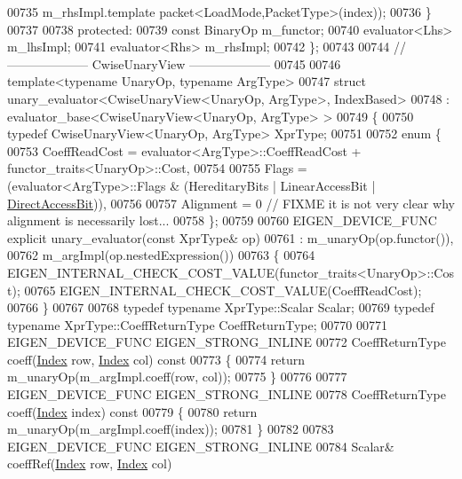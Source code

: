 \begin{DoxyCode}
00735                               m\_rhsImpl.template packet<LoadMode,PacketType>(index));
00736   \}
00737 
00738 \textcolor{keyword}{protected}:
00739   \textcolor{keyword}{const} BinaryOp m\_functor;
00740   evaluator<Lhs> m\_lhsImpl;
00741   evaluator<Rhs> m\_rhsImpl;
00742 \};
00743 
00744 \textcolor{comment}{// -------------------- CwiseUnaryView --------------------}
00745 
00746 \textcolor{keyword}{template}<\textcolor{keyword}{typename} UnaryOp, \textcolor{keyword}{typename} ArgType>
00747 \textcolor{keyword}{struct }unary\_evaluator<CwiseUnaryView<UnaryOp, ArgType>, IndexBased>
00748   : evaluator\_base<CwiseUnaryView<UnaryOp, ArgType> >
00749 \{
00750   \textcolor{keyword}{typedef} CwiseUnaryView<UnaryOp, ArgType> XprType;
00751   
00752   \textcolor{keyword}{enum} \{
00753     CoeffReadCost = evaluator<ArgType>::CoeffReadCost + functor\_traits<UnaryOp>::Cost,
00754     
00755     Flags = (evaluator<ArgType>::Flags & (HereditaryBits | LinearAccessBit | 
      \hyperlink{group__flags_gabf1e9d0516a933445a4c307ad8f14915}{DirectAccessBit})),
00756     
00757     Alignment = 0 \textcolor{comment}{// FIXME it is not very clear why alignment is necessarily lost...}
00758   \};
00759 
00760   EIGEN\_DEVICE\_FUNC \textcolor{keyword}{explicit} unary\_evaluator(\textcolor{keyword}{const} XprType& op)
00761     : m\_unaryOp(op.functor()), 
00762       m\_argImpl(op.nestedExpression()) 
00763   \{
00764     EIGEN\_INTERNAL\_CHECK\_COST\_VALUE(functor\_traits<UnaryOp>::Cost);
00765     EIGEN\_INTERNAL\_CHECK\_COST\_VALUE(CoeffReadCost);
00766   \}
00767 
00768   \textcolor{keyword}{typedef} \textcolor{keyword}{typename} XprType::Scalar Scalar;
00769   \textcolor{keyword}{typedef} \textcolor{keyword}{typename} XprType::CoeffReturnType CoeffReturnType;
00770 
00771   EIGEN\_DEVICE\_FUNC EIGEN\_STRONG\_INLINE
00772   CoeffReturnType coeff(\hyperlink{namespace_eigen_a62e77e0933482dafde8fe197d9a2cfde}{Index} row, \hyperlink{namespace_eigen_a62e77e0933482dafde8fe197d9a2cfde}{Index} col)\textcolor{keyword}{ const}
00773 \textcolor{keyword}{  }\{
00774     \textcolor{keywordflow}{return} m\_unaryOp(m\_argImpl.coeff(row, col));
00775   \}
00776 
00777   EIGEN\_DEVICE\_FUNC EIGEN\_STRONG\_INLINE
00778   CoeffReturnType coeff(\hyperlink{namespace_eigen_a62e77e0933482dafde8fe197d9a2cfde}{Index} index)\textcolor{keyword}{ const}
00779 \textcolor{keyword}{  }\{
00780     \textcolor{keywordflow}{return} m\_unaryOp(m\_argImpl.coeff(index));
00781   \}
00782 
00783   EIGEN\_DEVICE\_FUNC EIGEN\_STRONG\_INLINE
00784   Scalar& coeffRef(\hyperlink{namespace_eigen_a62e77e0933482dafde8fe197d9a2cfde}{Index} row, \hyperlink{namespace_eigen_a62e77e0933482dafde8fe197d9a2cfde}{Index} col)

\end{DoxyCode}
